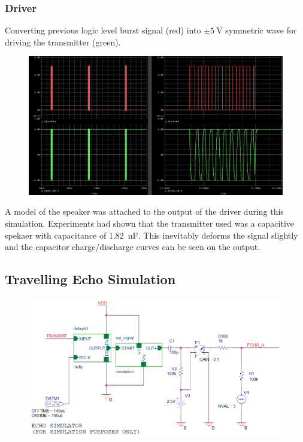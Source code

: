 \documentclass[12pt, a4paper]{article}
\begin{document}
            \pagebreak
            \subsubsection{Driver}

                \noindent Converting previous logic level burst signal (red) into $\pm \SI{5}{\volt}$ symmetric wave for driving the transmitter (green). 
                \begin{figure}[H]\centering
                    \includegraphics[width = \textwidth]{simulations/transmit/driver.png}
                    \caption[]{}
                \end{figure}

                A model of the speaker was attached to the output of the driver during this simulation. Experiments had shown that the transmitter used was a capacitive spekaer with capacitance of \SI{1.82}{\nano\farad}. This inevitably deforms the signal slightly and the capacitor charge/discharge curves can be seen on the output.

            \pagebreak
            \subsection{Travelling Echo Simulation}

                \begin{figure}[H]\centering
                    \includegraphics[width = \textwidth]{schematics/echo_sim.png}
                    \caption[]{}
                \end{figure}
\end{document}
